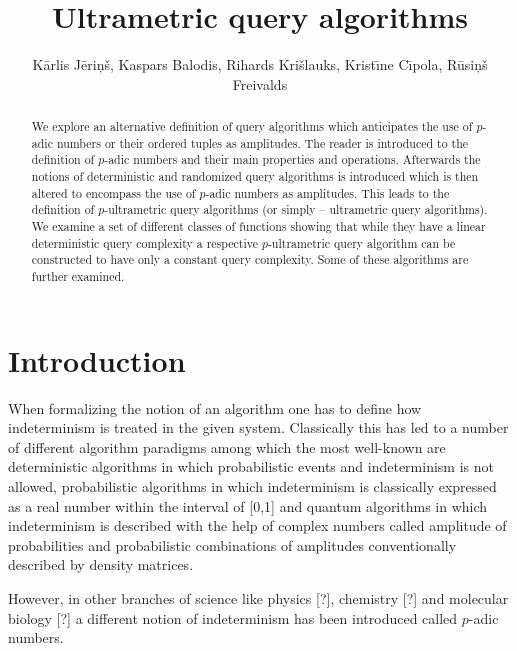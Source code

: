 \documentclass{llncs}
\begin{document}
\title{Ultrametric query algorithms}


\author{
K\= arlis J\= eri\c n\v s,
Kaspars Balodis,
Rihards Kri\v slauks,
Krist\= \i ne C\= \i pola,
R\= usi\c n\v s Freivalds}



\maketitle

\begin{abstract} 
We explore an alternative definition of query algorithms which anticipates the use of $p$-adic numbers or their ordered tuples as amplitudes. The reader is introduced to the definition of $p$-adic numbers and their main properties and operations. Afterwards the notions of deterministic and randomized query algorithms is introduced which is then altered to encompass the use of $p$-adic numbers as amplitudes. This leads to the definition of $p$-ultrametric query algorithms (or simply – ultrametric query algorithms). We examine a set of different classes of functions showing that while they have a linear deterministic query complexity a respective $p$-ultrametric query algorithm can be constructed to have only a constant query complexity. Some of these algorithms are further examined.
\end{abstract} 



\section{Introduction}
When formalizing the notion of an algorithm one has to define how indeterminism is treated in the given system. Classically this has led to a number of different algorithm paradigms among which the most well-known are deterministic algorithms in which probabilistic events and indeterminism is not allowed, probabilistic algorithms in which indeterminism is classically expressed as a real number within the interval of [0,1] and quantum algorithms in which indeterminism is described with the help of complex numbers called amplitude of probabilities and probabilistic combinations of amplitudes conventionally described by density matrices.

However, in other branches of science like physics [?], chemistry [?] and molecular biology [?] a different notion of indeterminism has been introduced called $p$-adic numbers.
\end{document}
